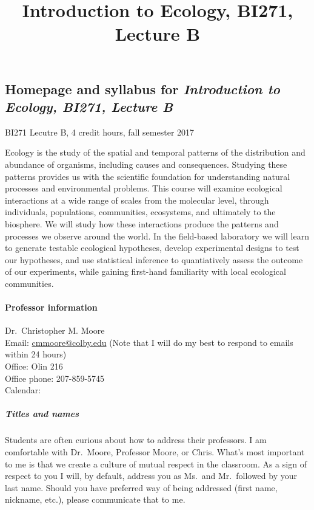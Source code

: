 \documentclass[]{article}
\title{Introduction to Ecology, BI271, Lecture B}
\date{}
\let\oldparagraph\paragraph
\renewcommand{\paragraph}[1]{\oldparagraph{#1}\mbox{}}
\let\oldsubparagraph\subparagraph
\renewcommand{\subparagraph}[1]{\oldsubparagraph{#1}\mbox{}}
\begin{document}
\maketitle

\subsection{\texorpdfstring{Homepage and syllabus for \emph{Introduction
to Ecology, BI271, Lecture B}
}{Homepage and syllabus for Introduction to Ecology, BI271, Lecture B }}\label{homepage-and-syllabus-for-introduction-to-ecology-bi271-lecture-b}

BI271 Lecutre B, 4 credit hours, fall semester 2017

Ecology is the study of the spatial and temporal patterns of the
distribution and abundance of organisms, including causes and
consequences. Studying these patterns provides us with the scientific
foundation for understanding natural processes and environmental
problems. This course will examine ecological interactions at a wide
range of scales from the molecular level, through individuals,
populations, communities, ecosystems, and ultimately to the biosphere.
We will study how these interactions produce the patterns and processes
we observe around the world. In the field-based laboratory we will learn
to generate testable ecological hypotheses, develop experimental designs
to test our hypotheses, and use statistical inference to quantiatively
assess the outcome of our experiments, while gaining first-hand
familiarity with local ecological communities.

\paragraph{Professor information }\label{professor-information}

Dr.~Christopher M. Moore\\
Email: \url{cmmoore@colby.edu} (Note that I will do my best to respond
to emails within 24 hours)\\
Office: Olin 216\\
Office phone: 207-859-5745\\
Calendar: ~

\subparagraph{Titles and names}\label{titles-and-names}

Students are often curious about how to address their professors. I am
comfortable with Dr.~Moore, Professor Moore, or Chris. What's most
important to me is that we create a culture of mutual respect in the
classroom. As a sign of respect to you I will, by default, address you
as Ms.~and Mr.~followed by your last name. Should you have preferred way
of being addressed (first name, nickname, etc.), please communicate that
to me.
\end{document}
